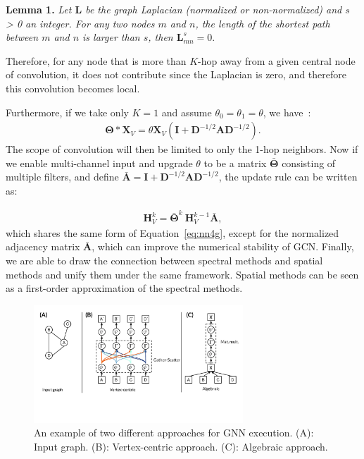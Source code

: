 \vspace{2mm}
\noindent \textbf{Lemma 1.} \textit{Let $\mathbf{L}$ be the graph Laplacian (normalized or non-normalized) and $s$ > 0 an integer. For any two nodes $m$ and $n$, the length of the shortest path between $m$ and $n$ is larger than $s$, then $\mathbf{L}^s_{mn} = 0$}.

Therefore, for any node that is more than $K$-hop away from a given central node of convolution, it does not contribute since the Laplacian is zero, and therefore this convolution becomes local.

Furthermore, if we take only $K=1$ and assume $\theta_0 = \theta_1 = \theta$, we have~\cite{gcn}:
\begin{gather}
\mathbf{\Theta} \ast \mathbf{X}_V =\theta \mathbf{X}_V (\mathbf{I} + \mathbf{D}^{-1/2}\mathbf{A}\mathbf{D}^{-1/2}).
\end{gather}
The scope of convolution will then be limited to only the 1-hop neighbors. Now if we enable multi-channel input and upgrade $\theta$ to be a matrix $\bar {\mathbf{\Theta}}$ consisting of multiple filters, and define $\bar {\mathbf{A}} = \mathbf{I} + \mathbf{D}^{-1/2}\mathbf{A}\mathbf{D}^{-1/2}$, the update rule can be written as:

\begin{gather}
\mathbf{H}_V^k = \bar {\mathbf{\Theta}}^k~\mathbf{H}_V^{k-1} \bar {\mathbf{A}},
\end{gather}
which shares the same form of Equation~\ref{eq:nn4g}, except for the normalized adjacency matrix $\bar {\mathbf{A}}$, which can improve the numerical stability of GCN. Finally, we are able to draw the connection between spectral methods and spatial methods and unify them under the same framework. Spatial methods can be seen as a first-order approximation of the spectral methods.
\begin{figure}[t]
 \centering
\includegraphics[width=0.70\textwidth]{./images/gnnsys.pdf}
 \caption{An example of two different approaches for GNN execution. (A): Input graph. (B): Vertex-centric approach. (C): Algebraic approach.}
 \label{fig:ggnnsys}
\end{figure}

